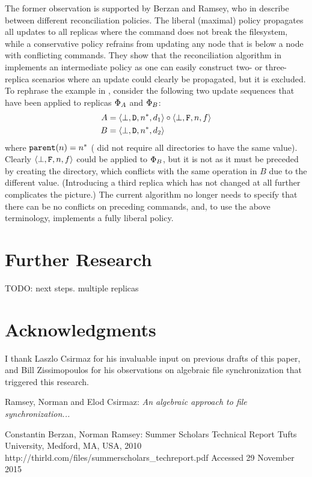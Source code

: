 \documentclass[12pt]{article}
\begin{document}
The former observation is supported by Berzan and Ramsey, who in \cite{CBNR} 
describe between different reconciliation policies.
The liberal (maximal) policy propagates all updates to all replicas where
the command does not break the filesystem, while a conservative policy
refrains from updating any node that is below a node with conflicting commands.
They show that the reconciliation algorithm in \cite{NREC} implements
an intermediate policy as one can easily construct two- or three-replica scenarios
where an update could clearly be propagated, but it is excluded.
To rephrase the example in \cite{CBNR}, consider the following two
update sequences that have been applied to replicas $\Phi_A$ and $\Phi_B$:
\begin{align*}
A&=\langle{\bot,\mathtt{D},n^*,d_1}\rangle\circ\langle{\bot,\mathtt{F},n,f}\rangle \\
B&=\langle{\bot,\mathtt{D},n^*,d_2}\rangle
\end{align*}
where $\mathtt{parent}(n)=n^*$ (\cite{NREC} did not require all directories to have the same value).
Clearly $\langle{\bot,\mathtt{F},n,f}\rangle$ could be applied to $\Phi_B$, but it is not as
it must be preceded by creating the directory, which conflicts with the same operation in $B$
due to the different value.
(Introducing a third replica which has not changed at all further complicates the picture.)
The current algorithm no longer needs to specify that there can be no conflicts
on preceding commands, and, to use the above terminology, implements a fully liberal policy.




\section{Further Research}


TODO: next steps. multiple replicas




\section{Acknowledgments}

I thank Laszlo Csirmaz for his invaluable input on previous drafts of this paper,
and Bill Zissimopoulos for his observations on algebraic file synchronization that triggered this research.



\begin{thebibliography}{99}

 Ramsey, Norman and Elod Csirmaz: {\it An algebraic approach to
file synchronization...}

 Constantin Berzan, Norman Ramsey: Summer Scholars Technical Report
Tufts University, Medford, MA, USA, 2010
http://thirld.com/files/summerscholars\_techreport.pdf
Accessed 29 November 2015


\end{thebibliography}
\end{document}
